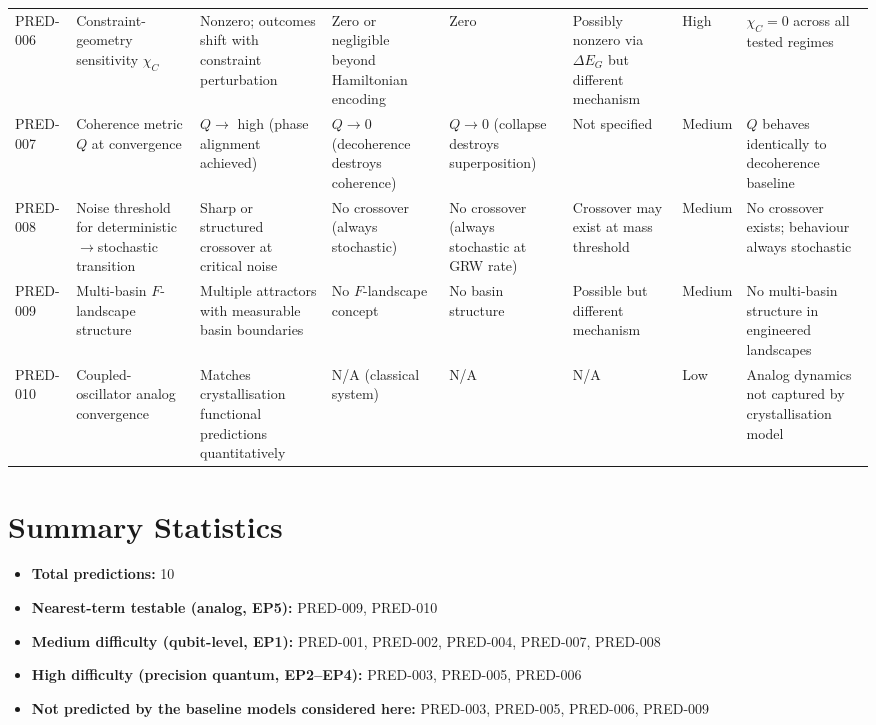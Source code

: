 \documentclass[12pt]{article}
\begin{document}
\begin{longtable}{@{}lp{2cm}p{2.2cm}p{2cm}p{1.8cm}p{1.8cm}p{1.5cm}p{2.2cm}@{}}
PRED-006 & Constraint-geometry sensitivity $\chi_C$ & Nonzero; outcomes shift with constraint perturbation & Zero or negligible beyond Hamiltonian encoding & Zero & Possibly nonzero via $\Delta E_G$ but different mechanism & High & $\chi_C = 0$ across all tested regimes \\
\addlinespace

PRED-007 & Coherence metric $Q$ at convergence & $Q \to$ high (phase alignment achieved) & $Q \to 0$ (decoherence destroys coherence) & $Q \to 0$ (collapse destroys superposition) & Not specified & Medium & $Q$ behaves identically to decoherence baseline \\
\addlinespace

PRED-008 & Noise threshold for deterministic$\to$stochastic transition & Sharp or structured crossover at critical noise & No crossover (always stochastic) & No crossover (always stochastic at GRW rate) & Crossover may exist at mass threshold & Medium & No crossover exists; behaviour always stochastic \\
\addlinespace

PRED-009 & Multi-basin $F$-landscape structure & Multiple attractors with measurable basin boundaries & No $F$-landscape concept & No basin structure & Possible but different mechanism & Medium & No multi-basin structure in engineered landscapes \\
\addlinespace

PRED-010 & Coupled-oscillator analog convergence & Matches crystallisation functional predictions quantitatively & N/A (classical system) & N/A & N/A & Low & Analog dynamics not captured by crystallisation model \\

\end{longtable}

\section{Summary Statistics}

\begin{itemize}
    \item \textbf{Total predictions:} 10
    \item \textbf{Nearest-term testable (analog, EP5):} PRED-009, PRED-010
    \item \textbf{Medium difficulty (qubit-level, EP1):} PRED-001, PRED-002, PRED-004, PRED-007, PRED-008
    \item \textbf{High difficulty (precision quantum, EP2--EP4):} PRED-003, PRED-005, PRED-006
    \item \textbf{Not predicted by the baseline models considered here:} PRED-003, PRED-005, PRED-006, PRED-009
\end{itemize}
\end{document}
